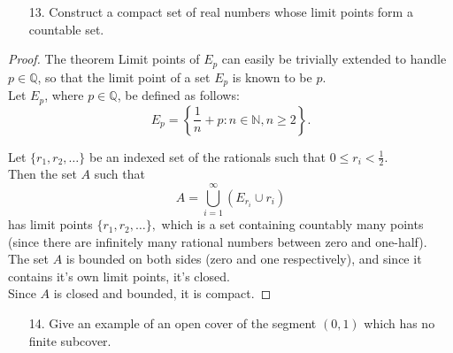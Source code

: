 \documentclass[10pt]{article}
\theoremstyle{definition}
\theoremstyle{plain}
\newcommand{\N}{\mathbb{N}}
\newcommand{\Q}{\mathbb{Q}}
\begin{document}
\pagebreak




\begin{enumerate}
\item[13.] Construct a compact set of real numbers whose limit points form a countable set.
\end{enumerate}

\begin{proof}
The theorem Limit points of $E_p$ can easily be trivially extended to handle $p\in\Q$, so that the limit point of a set $E_p$ is known to be $p$. \\

Let $E_p$, where $p\in\Q$, be defined as follows:
$$E_p = \left\{\frac{1}{n} + p: n\in\N, n\geq 2\right\}.$$

Let $\{r_1,r_2,\dots\}$ be an indexed set of the rationals such that $0\leq r_i<\frac{1}{2}$. \\

Then the set $A$ such that
$$A=\bigcup_{i=1}^\infty (E_{r_i} \cup {r_i})$$
has limit points $\{r_1,r_2,\dots\},$ which is a set containing countably many points (since there are infinitely many rational numbers between zero and one-half). \\

The set $A$ is bounded on both sides (zero and one respectively), and since it contains it's own limit points, it's closed.\\

Since $A$ is closed and bounded, it is compact.
\end{proof}





\pagebreak




\begin{enumerate}
\item[14.] Give an example of an open cover of the segment $(0,1)$ which has no finite subcover.
\end{enumerate}
\end{document}
